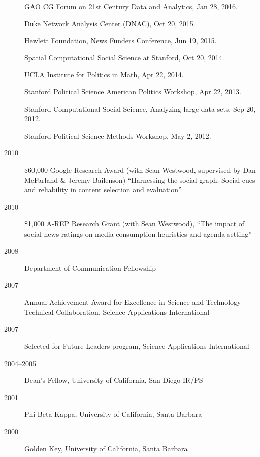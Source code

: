 \documentclass[letterpaper,11pt]{article}
\newcommand{\resheading}[1]{\vspace{4pt}{\large
\colorbox{mygrey}{\begin{minipage}{\textwidth}{\textbf{#1
\vphantom{p\^{E}}}}\end{minipage}}}\vspace{4pt}}
\begin{document}
\begin{description}
\item[] GAO CG Forum on 21st Century Data and Analytics, Jan 28, 2016. 
\item[] Duke Network Analysis Center (DNAC), Oct 20, 2015. 
\item[] Hewlett Foundation, News Funders Conference, Jun 19, 2015. 
\item[] Spatial Computational Social Science at Stanford, Oct 20, 2014.
\item[] UCLA Institute for Politics in Math, Apr 22, 2014.
\item[] Stanford Political Science American Politics Workshop, Apr 22, 2013.
\item[] Stanford Computational Social Science, Analyzing large data sets, Sep 20, 2012.
\item[] Stanford Political Science Methods Workshop, May 2, 2012.
\end{description}


\resheading{Honors and Awards}
\begin{description}
\item[2010] \$60,000 Google Research Award (with Sean Westwood, supervised by Dan McFarland \& Jeremy Bailenson) ``Harnessing the social graph: Social cues and reliability in content selection and evaluation''
\item[2010] \$1,000 A-REP Research Grant (with Sean Westwood), ``The impact of social news ratings on media consumption heuristics and agenda setting''
\item[2008] Department of Communication Fellowship
\item[2007] Annual Achievement Award for Excellence in Science and Technology - Technical Collaboration, Science Applications International
\item[2007] Selected for Future Leaders program, Science Applications International
\item[2004--2005] Dean's Fellow, University of California, San Diego IR/PS 
\item[2001] Phi Beta Kappa, University of California, Santa Barbara
\item[2000] Golden Key, University of California, Santa Barbara
\end{description}
\end{document}
